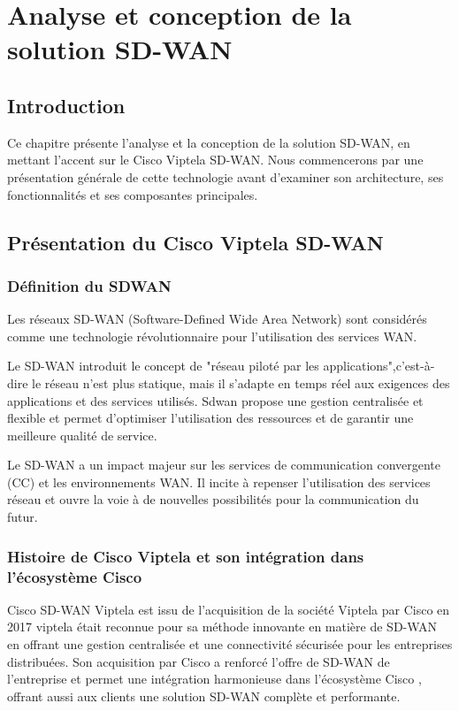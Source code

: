 \chapter{Analyse et conception de la solution SD-WAN }



\section*{Introduction }
Ce chapitre présente l'analyse et la conception de la solution SD-WAN, en mettant l'accent sur le Cisco Viptela SD-WAN. Nous commencerons par une présentation générale de cette technologie avant d'examiner son architecture, ses fonctionnalités et ses composantes principales.

\section{Présentation du Cisco Viptela SD-WAN }
\subsection{Définition du  SDWAN }

Les réseaux SD-WAN (Software-Defined Wide Area Network) sont considérés comme une technologie révolutionnaire pour l'utilisation des services WAN. 

Le SD-WAN introduit le concept de "réseau piloté par les applications",c’est-à-dire le réseau n'est plus statique, mais il s'adapte en temps réel aux exigences des applications et des services utilisés. Sdwan propose une gestion centralisée et flexible et permet d'optimiser l'utilisation des ressources et de garantir une meilleure qualité de service.

Le SD-WAN a un impact majeur sur les services de communication convergente (CC) et les environnements WAN. Il incite à repenser l'utilisation des services réseau et ouvre la voie à de nouvelles possibilités pour la communication du futur.
\subsection{Histoire de Cisco Viptela et son intégration dans l'écosystème Cisco }

Cisco SD-WAN Viptela est issu de l'acquisition de la société Viptela par Cisco en 2017 viptela était reconnue pour sa méthode innovante en matière de SD-WAN en offrant une gestion centralisée et une connectivité sécurisée pour les entreprises distribuées. Son acquisition par Cisco a renforcé l'offre de SD-WAN de l'entreprise et permet une intégration harmonieuse dans l'écosystème Cisco , offrant aussi aux clients une solution SD-WAN complète et performante.
